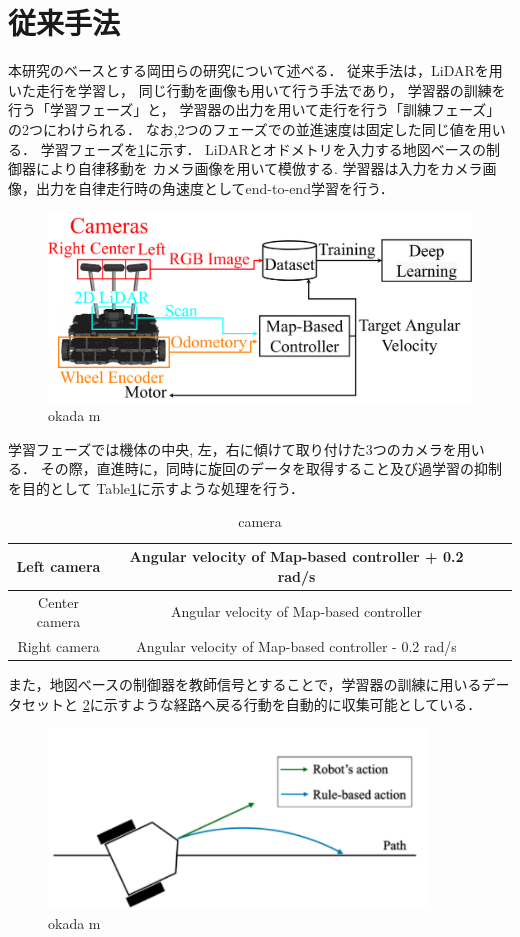 \section{従来手法}
本研究のベースとする岡田らの研究について述べる．
従来手法は，LiDARを用いた走行を学習し，
同じ行動を画像も用いて行う手法であり，
学習器の訓練を行う「学習フェーズ」と，
学習器の出力を用いて走行を行う「訓練フェーズ」の2つにわけられる．
なお,2つのフェーズでの並進速度は固定した同じ値を用いる．
学習フェーズを\ref{fig::okada_method_ler}に示す．
LiDARとオドメトリを入力する地図ベースの制御器により自律移動を
カメラ画像を用いて模倣する.
学習器は入力をカメラ画像，出力を自律走行時の角速度としてend-to-end学習を行う．
\begin{figure}[h]
    \centering
    \includegraphics[width = 12cm]{./figs/system_learning_okada.pdf}
    \caption{okada m}
    \label{fig::okada_method_ler}
\end{figure}

\newpage
学習フェーズでは機体の中央, 左，右に傾けて取り付けた3つのカメラを用いる．
その際，直進時に，同時に旋回のデータを取得すること及び過学習の抑制を目的として
Table\ref{tb::camera_ang}に示すような処理を行う．
\begin{table}[H]
    \centering
    \caption{camera }
    \begin{tabular}{|c|c|ll}
    \hline
    Left camera   & Angular velocity of Map-based controller + 0.2 rad/s \\ \hline
    Center camera & Angular velocity of Map-based controller             \\ \hline
    Right camera  & Angular velocity of Map-based controller - 0.2 rad/s  \\ \hline
    \end{tabular}
    \label{tb::camera_ang}
    \end{table}
また，地図べースの制御器を教師信号とすることで，学習器の訓練に用いるデータセットと
\ref{fig::okada_path}に示すような経路へ戻る行動を自動的に収集可能としている．
\begin{figure}[h]
    \centering
    \includegraphics[width = 10cm]{./figs/okada_path.png}
    \caption{okada m}
    \label{fig::okada_path}
\end{figure}

